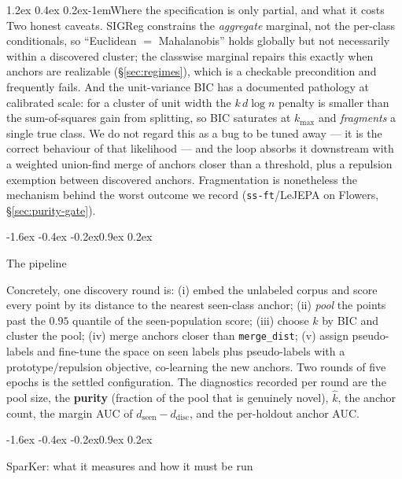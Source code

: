 \documentclass{article}
\makeatletter
\renewcommand\subsection{\@startsection{subsection}{2}{\z@}%
  {-1.6ex \@plus -0.4ex \@minus -0.2ex}{0.9ex \@plus 0.2ex}%
  {\normalsize\bf\raggedright}}
\renewcommand\paragraph{\@startsection{paragraph}{4}{\z@}%
  {1.2ex \@plus 0.4ex \@minus 0.2ex}{-1em}{\normalsize\bf}}
\makeatother
\begin{document}
\paragraph{Where the specification is only partial, and what it costs}
Two honest caveats. SIGReg constrains the \emph{aggregate} marginal, not the
per-class conditionals, so ``Euclidean $=$ Mahalanobis'' holds globally but not
necessarily within a discovered cluster; the classwise marginal repairs this
exactly when anchors are realizable (\S\ref{sec:regimes}), which is a
checkable precondition and frequently fails. And the unit-variance BIC has a
documented pathology at calibrated scale: for a cluster of unit width the
$k\,d\log n$ penalty is smaller than the sum-of-squares gain from splitting,
so BIC saturates at $k_{\max}$ and \emph{fragments} a single true class. We do
not regard this as a bug to be tuned away --- it is the correct behaviour of
that likelihood --- and the loop absorbs it downstream with a weighted
union-find merge of anchors closer than a threshold, plus a repulsion
exemption between discovered anchors. Fragmentation is nonetheless the
mechanism behind the worst outcome we record
(\texttt{ss-ft}/LeJEPA on Flowers, \S\ref{sec:purity-gate}).

\subsection{The pipeline}

Concretely, one discovery round is: (i) embed the unlabeled corpus and score
every point by its distance to the nearest seen-class anchor; (ii) \emph{pool}
the points past the $0.95$ quantile of the seen-population score; (iii) choose
$k$ by BIC and cluster the pool; (iv) merge anchors closer than
\texttt{merge\_dist}; (v) assign pseudo-labels and fine-tune the space on seen
labels plus pseudo-labels with a prototype/repulsion objective, co-learning the
new anchors. Two rounds of five epochs is the settled configuration. The
diagnostics recorded per round are the pool size, the \textbf{purity} (fraction
of the pool that is genuinely novel), $\hat k$, the anchor count, the margin
AUC of $d_{\mathrm{seen}}-d_{\mathrm{disc}}$, and the per-holdout anchor AUC.

\subsection{SparKer: what it measures and how it must be run}
\label{sec:sparker}
\end{document}

